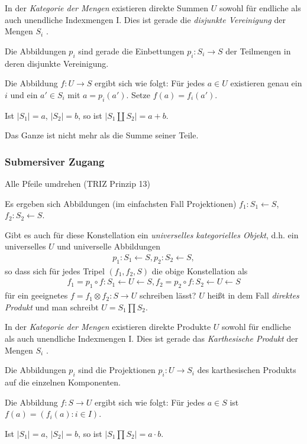 \documentclass[11pt,a4paper]{article}
\begin{document}
In der \emph{Kategorie der Mengen} existieren direkte Summen $U$ sowohl für
endliche als auch unendliche Indexmengen I. Dies ist gerade die
\emph{disjunkte Vereinigung} der Mengen $S_i$ .

Die Abbildungen $p_i$ sind gerade die Einbettungen $p_i: S_i \to S$ der
Teilmengen in deren disjunkte Vereinigung.

Die Abbildung $f: U \to S$ ergibt sich wie folgt: Für jedes $a\in U$
existieren genau ein $i$ und ein $a'\in S_i$ mit $a=p_i(a')$. Setze
$f(a)=f_i(a')$.

Ist $|S_1| = a$, $|S_2| = b$, so ist $|S_1 \coprod S_2| = a+b$.

Das Ganze ist nicht mehr als die Summe seiner Teile.

\subsubsection*{Submersiver Zugang}

Alle Pfeile umdrehen (TRIZ Prinzip 13)

Es ergeben sich Abbildungen (im einfachsten Fall Projektionen) $f_1: S_1
\leftarrow S$, $f_2: S_2 \leftarrow S$.

Gibt es auch für diese Konstellation ein \emph{universelles kategorielles
  Objekt}, d.h. ein universelles $U$ und universelle Abbildungen
\begin{gather*}
  p_1: S_1 \leftarrow  S, p_2: S_2 \leftarrow  S,  
\end{gather*}
so dass sich für jedes Tripel $(f_1 , f_2 , S)$ die obige Konstellation als
\begin{gather*}
  f_1 = p_1 \circ f: S_1 \leftarrow U \leftarrow S, f_2 = p_2 \circ f: S_2
  \leftarrow U \leftarrow S
\end{gather*}
für ein geeignetes $f = f_1 \otimes f_2: S \to U$ schreiben lässt? $U$ heißt
in dem Fall \emph{direktes Produkt} und man schreibt $U = S_1 \prod S_2$.

In der \emph{Kategorie der Mengen} existieren direkte Produkte $U$ sowohl für
endliche als auch unendliche Indexmengen I. Dies ist gerade das
\emph{Karthesische Produkt} der Mengen $S_i$ .

Die Abbildungen $p_i$ sind die Projektionen $p_i: U \to S_i$ des karthesischen
Produkts auf die einzelnen Komponenten.

Die Abbildung $f: S\to U$ ergibt sich wie folgt: Für jedes $a\in S$
ist $f(a)=(f_i(a):i\in I)$.

Ist $|S_1| = a$, $|S_2| = b$, so ist $|S_1 \prod S_2| = a\cdot b$.
\end{document}
